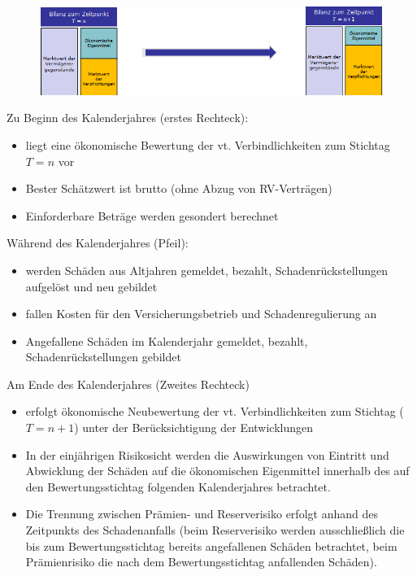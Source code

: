 \documentclass[12pt]{report}
\theoremstyle{dotless}
\theoremstyle{definition}
\begin{document}
\begin{figure}[ht]
	\centering
	\includegraphics[width= \textwidth]{Bilder/Risikohorizont.png}
\end{figure}



Zu Beginn des Kalenderjahres (erstes Rechteck):
\begin{itemize}
\item liegt eine ökonomische Bewertung der vt. Verbindlichkeiten zum Stichtag $T=n$ vor
\item Bester Schätzwert ist brutto (ohne Abzug von RV-Verträgen)
\item Einforderbare Beträge werden gesondert berechnet
\end{itemize}



Während des Kalenderjahres (Pfeil):
\begin{itemize}
\item werden Schäden aus Altjahren gemeldet, bezahlt, Schadenrückstellungen aufgelöst und neu gebildet
\item fallen Kosten für den Versicherungsbetrieb und Schadenregulierung an
\item Angefallene Schäden im Kalenderjahr gemeldet,  bezahlt, Schadenrückstellungen  gebildet
\end{itemize}


Am Ende des Kalenderjahres (Zweites Rechteck)
\begin{itemize}
\item erfolgt ökonomische Neubewertung der vt. Verbindlichkeiten zum Stichtag ($T=n+1$) unter der Berücksichtigung der Entwicklungen
\end{itemize}

\begin{itemize}
\item In der einjährigen Risikosicht werden die Auswirkungen von Eintritt und Abwicklung der Schäden auf die ökonomischen Eigenmittel innerhalb des auf den Bewertungsstichtag folgenden Kalenderjahres betrachtet.
\item Die Trennung zwischen Prämien- und Reserverisiko erfolgt anhand des Zeitpunkts des Schadenanfalls (beim Reserverisiko werden ausschließlich die bis zum Bewertungsstichtag bereits angefallenen Schäden betrachtet, beim Prämienrisiko die nach dem Bewertungsstichtag anfallenden Schäden).
\end{itemize}
\end{document}
